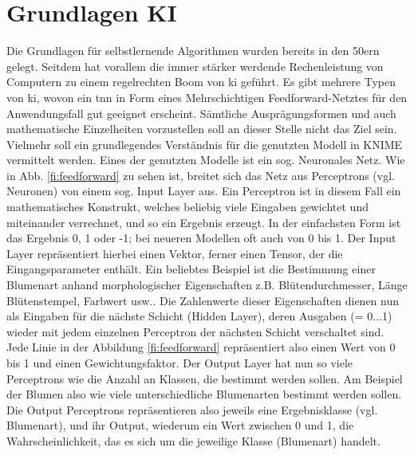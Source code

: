 \section{Grundlagen KI}
\label{sec:grundlagenKI}
Die Grundlagen für selbstlernende Algorithmen wurden bereits in den 50ern gelegt. Seitdem hat vorallem die immer stärker werdende Rechenleistung von Computern zu einem regelrechten Boom von \ac{ki} geführt. Es gibt mehrere Typen von \ac{ki}, wovon ein \ac{tnn} in Form eines Mehrschichtigen Feedforward-Netztes für den Anwendungsfall gut geeignet erscheint.\cite{ki} \newline
Sämtliche Ausprägungsformen und auch mathematische Einzelheiten vorzustellen soll an dieser Stelle nicht das Ziel sein. Vielmehr soll ein grundlegendes Verständnis für die genutzten Modell in \ac{KNIME} vermittelt werden. Eines der genutzten Modelle ist ein sog. Neuronales Netz.
Wie in Abb. \ref{fi:feedforward} zu sehen ist, breitet sich das Netz aus Perceptrons (vgl. Neuronen) von einem sog. Input Layer aus. Ein Perceptron ist in diesem Fall ein mathematisches Konstrukt, welches beliebig viele Eingaben gewichtet und miteinander verrechnet, und so ein Ergebnis erzeugt. In der einfachsten Form ist das Ergebnis 0, 1 oder -1; bei neueren Modellen oft auch von 0 bis 1. Der Input Layer repräsentiert hierbei einen Vektor, ferner einen Tensor, der die Eingangsparameter enthält. Ein beliebtes Beispiel ist die Bestimmung einer Blumenart anhand morphologischer Eigenschaften z.B. Blütendurchmesser, Länge Blütenstempel, Farbwert usw.. Die Zahlenwerte dieser Eigenschaften dienen nun als Eingaben für die nächste Schicht (Hidden Layer), deren Ausgaben (= 0...1) wieder mit jedem einzelnen Perceptron der nächsten Schicht verschaltet sind. Jede Linie in der Abbildung \ref{fi:feedforward} repräsentiert also einen Wert von 0 bis 1 und einen Gewichtungsfaktor.
Der Output Layer hat nun so viele Perceptrons wie die Anzahl an Klassen, die bestimmt werden sollen. Am Beispiel der Blumen also wie viele unterschiedliche Blumenarten bestimmt werden sollen. Die Output Perceptrons repräsentieren also jeweils eine Ergebnisklasse (vgl. Blumenart), und ihr Output, wiederum ein Wert zwischen 0 und 1, die Wahrscheinlichkeit, das es sich um die jeweilige Klasse (Blumenart) handelt.

